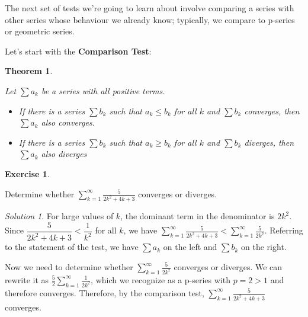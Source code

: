 \documentclass[
]{book}
\providecommand{\tightlist}{%
  \setlength{\itemsep}{0pt}\setlength{\parskip}{0pt}}
\newtheorem{theorem}{Theorem}[chapter]
\theoremstyle{definition}
\theoremstyle{definition}
\theoremstyle{definition}
\newtheorem{exercise}{Exercise}[chapter]
\theoremstyle{definition}
\theoremstyle{remark}
\newtheorem*{solution}{Solution}
\begin{document}
The next set of tests we're going to learn about involve comparing a series with other series whose behaviour we already know; typically, we compare to p-series or geometric series.

Let's start with the \textbf{Comparison Test}:

\begin{theorem}
\protect\hypertarget{thm:unlabeled-div-199}{}\label{thm:unlabeled-div-199}

Let \(\displaystyle \sum a_k\) be a series with all positive terms.

\begin{itemize}
\tightlist
\item
  If there is a series \(\displaystyle \sum b_k\) such that \(a_k\leq b_k\) for all \(k\) and \(\displaystyle \sum b_k\) converges, then \(\displaystyle \sum a_k\) also converges.
\item
  If there is a series \(\displaystyle \sum b_k\) such that \(a_k\geq b_k\) for all \(k\) and \(\displaystyle \sum b_k\) diverges, then \(\displaystyle \sum a_k\) also diverges
\end{itemize}

\end{theorem}

\begin{exercise}
\protect\hypertarget{exr:unlabeled-div-200}{}\label{exr:unlabeled-div-200}

Determine whether \(\displaystyle \sum_{k=1}^\infty \frac{5}{2k^2+4k+3}\) converges or diverges.

\end{exercise}

\begin{solution}

For large values of \(k\), the dominant term in the denominator is \(2k^2\). Since \(\dfrac{5}{2k^2+4k+3}<\dfrac{1}{k^2}\) for all \(k\), we have \(\displaystyle \sum_{k=1}^\infty \frac{5}{2k^2+4k+3}< \displaystyle \sum_{k=1}^\infty \frac{5}{2k^2}\). Referring to the statement of the test, we have \(\displaystyle \sum a_k\) on the left and \(\displaystyle \sum b_k\) on the right.

Now we need to determine whether \(\displaystyle \sum_{k=1}^\infty \frac{5}{2k^2}\) converges or diverges. We can rewrite it as \(\displaystyle \frac{5}{2} \sum_{k=1}^\infty \frac{1}{2k^2}\), which we recognize as a p-series with \(p=2>1\) and therefore converges. Therefore, by the comparison test, \(\displaystyle \sum_{k=1}^\infty \frac{5}{2k^2+4k+3}\) converges.

\end{solution}
\end{document}
